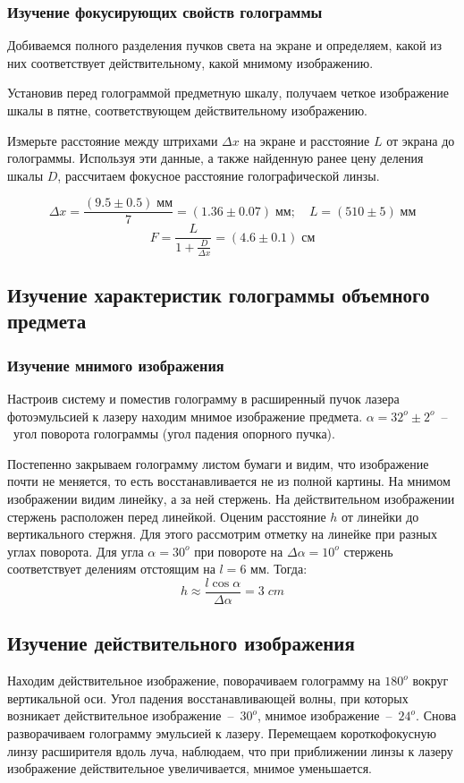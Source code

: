     \subsubsection*{Изучение фокусирующих свойств голограммы}

        Добиваемся полного разделения пучков света на экране и определяем, какой из них соответствует действительному, какой мнимому изображению. 

        \noindent Установив перед голограммой предметную шкалу, получаем четкое изображение шкалы в пятне, соответствующем действительному изображению.
        
        \noindent Измерьте расстояние между штрихами $ \Delta x $ на экране и расстояние $L$ от экрана до голограммы. Используя эти данные, а также найденную ранее цену деления шкалы $D$, рассчитаем фокусное расстояние голографической линзы.
        
        \[ \Delta x = \frac{(9.5 \pm 0.5) \; мм}{7} = (1.36\pm 0.07) \; мм   ; \quad L = (510 \pm 5) \; мм \]
        \[ F = \dfrac{L}{1+\frac{D}{\Delta x}} = (4.6 \pm 0.1) \; см \]
        
\subsection{Изучение характеристик голограммы объемного предмета}
    \subsubsection*{Изучение мнимого изображения}
        
        \noindent Настроив систему и поместив голограмму в расширенный пучок лазера фотоэмульсией к лазеру находим мнимое изображение предмета. 
        $ \alpha = 32^o \pm 2^o $~--~угол поворота голограммы (угол падения опорного пучка).
        
        Постепенно закрываем голограмму листом бумаги и видим, что изображение почти не меняется, то есть восстанавливается не из полной картины.        
        На мнимом изображении видим линейку, а за ней стержень. На действительном изображении стержень расположен перед линейкой. 
        Оценим расстояние $h$ от линейки до вертикального стержня. Для этого рассмотрим отметку на линейке при разных углах поворота. Для угла $\alpha = 30^o$ при повороте на $\Delta \alpha =  10^o$ стержень соответствует делениям отстоящим на $l = 6$ мм. Тогда: \[h \approx \frac{l \cos \alpha}{\Delta \alpha} = 3 \; cm \]

    \subsection{Изучение действительного изображения}

        Находим действительное изображение, поворачиваем голограмму на $180^o$ вокруг вертикальной оси.
        Угол падения восстанавливающей волны, при которых возникает действительное изображение~--~$30^o$, мнимое изображение~--~$24^o$.
        Снова разворачиваем голограмму эмульсией к лазеру. Перемещаем короткофокусную линзу расширителя вдоль луча, наблюдаем, что при приближении линзы к лазеру изображение действительное увеличивается, мнимое уменьшается.
